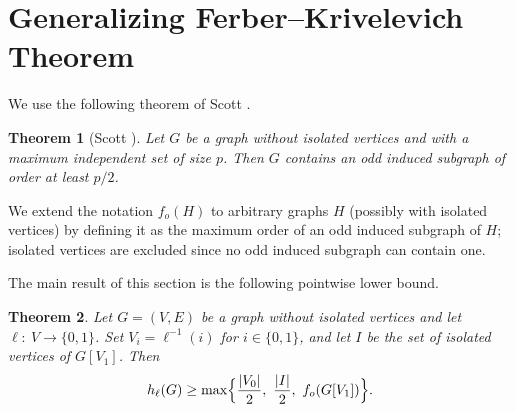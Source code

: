 \documentclass{article}
\newcommand{\2}{\vspace{0.2cm}}
\newtheorem{theorem}{Theorem}[section]
\begin{document}
\section{Generalizing Ferber--Krivelevich Theorem}\label{sec:FK}

We use the following theorem of Scott \cite{Scott1992}.

\begin{theorem}[Scott \cite{Scott1992}]\label{thm:Scott}
Let $G$ be a graph without isolated vertices and with a maximum independent set of size $p$. Then $G$ contains an odd induced subgraph of order at least $p/2$.
\end{theorem}

We extend the notation $f_o(H)$ to arbitrary graphs $H$ (possibly with isolated vertices) by defining it as the maximum order of an odd induced subgraph of $H$; isolated vertices are excluded since no odd induced subgraph can contain one.

The main result of this section is the following pointwise lower bound.

\begin{theorem}\label{oddevenIS}
Let $G=(V,E)$ be a graph without isolated vertices and let $\ell:\ V\to\{0,1\}$. Set $V_i=\ell^{-1}(i)$ for $i\in\{0,1\}$, and let $I$ be the set of isolated vertices of $G[V_1]$. Then
$$
h_{\ell}(G)\ge \max\Bigl\{\frac{|V_0|}{2},\ \frac{|I|}{2},\ f_o(G[V_1])\Bigr\}.
$$
\end{theorem}
\end{document}
